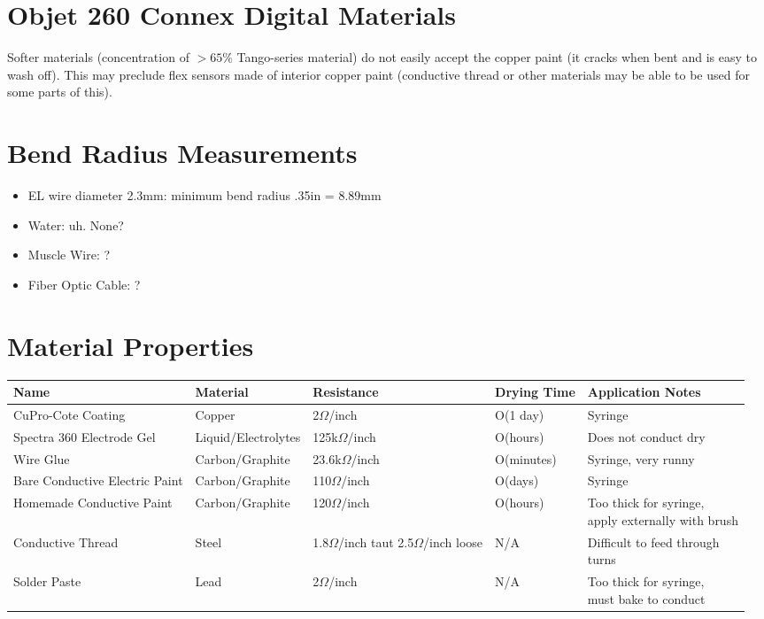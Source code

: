 \section{Objet 260 Connex Digital Materials}
Softer materials (concentration of $> 65\%$ Tango-series material) do not easily accept the copper paint (it cracks when bent and is easy to wash off).  This may preclude flex sensors made of interior copper paint (conductive thread or other materials may be able to be used for some parts of this).

\section{Bend Radius Measurements}
\begin{itemize}
\item EL wire diameter 2.3mm: minimum bend radius .35in = 8.89mm
\item Water: uh.  None?
\item Muscle Wire: ?
\item Fiber Optic Cable: ?
\end{itemize}

\section{Material Properties}

\begin{table*}[t]
\begin{tabular}{ l || l | p{3cm} | l | p{4cm} }
  \hline
  Name & Material & Resistance & Drying Time & Application Notes\\ \hline
  CuPro-Cote Coating & Copper & 2$\Omega$/inch & O(1 day) & Syringe \\ \hline
  Spectra 360 Electrode Gel & Liquid/Electrolytes & 125k$\Omega$/inch & O(hours) & Does not conduct dry \\ \hline
  Wire Glue & Carbon/Graphite &  23.6k$\Omega$/inch & O(minutes) & Syringe, very runny \\ \hline
  Bare Conductive Electric Paint & Carbon/Graphite & 110$\Omega$/inch & O(days) & Syringe \\ \hline
  Homemade Conductive Paint & Carbon/Graphite & 120$\Omega$/inch & O(hours) & \parbox{4cm}{Too thick for syringe,\\ apply externally with brush} \\ \hline
  Conductive Thread & Steel & \parbox{3cm}{1.8$\Omega$/inch taut \\ 2.5$\Omega$/inch loose} & N/A & \parbox{4cm}{Difficult to feed through\\turns} \\ \hline
  Solder Paste & Lead & 2$\Omega$/inch & N/A & \parbox{4cm}{Too thick for syringe,\\ must bake to conduct} \\ \hline
\end{tabular}
\end{table*}